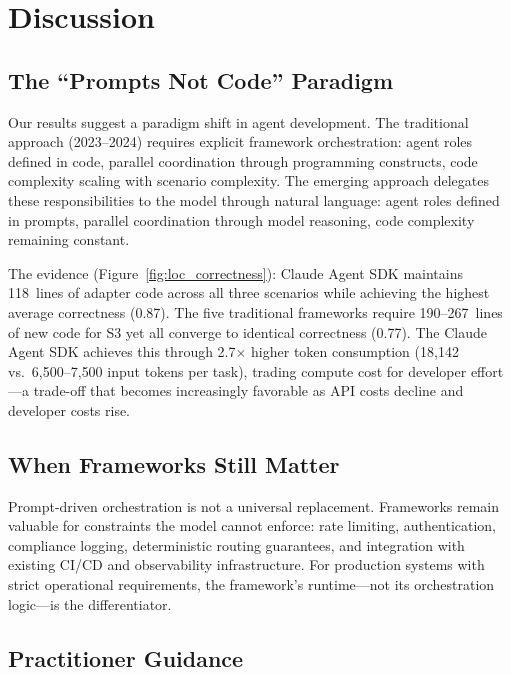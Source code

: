\documentclass[sigconf]{acmart}
\begin{document}
\section{Discussion}

\subsection{The ``Prompts Not Code'' Paradigm}

Our results suggest a paradigm shift in agent development. The traditional approach (2023--2024) requires explicit framework orchestration: agent roles defined in code, parallel coordination through programming constructs, code complexity scaling with scenario complexity. The emerging approach delegates these responsibilities to the model through natural language: agent roles defined in prompts, parallel coordination through model reasoning, code complexity remaining constant.

The evidence (Figure~\ref{fig:loc_correctness}): Claude Agent SDK maintains 118~lines of adapter code across all three scenarios while achieving the highest average correctness (0.87). The five traditional frameworks require 190--267~lines of new code for S3 yet all converge to identical correctness (0.77). The Claude Agent SDK achieves this through 2.7$\times$ higher token consumption (18{,}142 vs.\ 6{,}500--7{,}500 input tokens per task), trading compute cost for developer effort---a trade-off that becomes increasingly favorable as API costs decline and developer costs rise.

\subsection{When Frameworks Still Matter}

Prompt-driven orchestration is not a universal replacement. Frameworks remain valuable for constraints the model cannot enforce: rate limiting, authentication, compliance logging, deterministic routing guarantees, and integration with existing CI/CD and observability infrastructure. For production systems with strict operational requirements, the framework's runtime---not its orchestration logic---is the differentiator.

\subsection{Practitioner Guidance}
\end{document}
